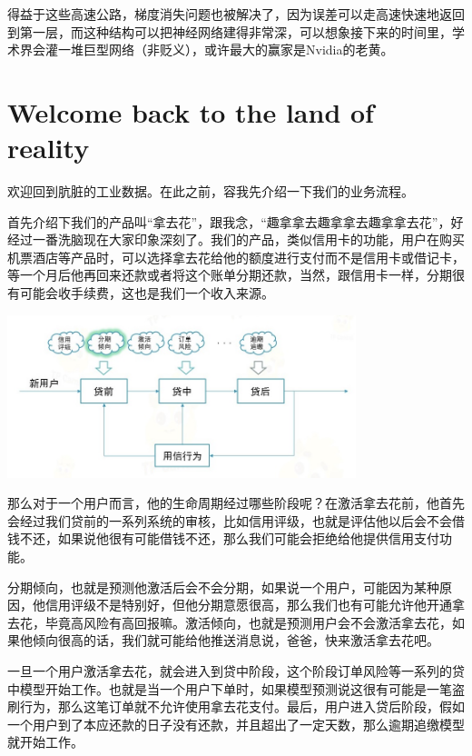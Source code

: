 \documentclass{article}
\begin{document}
得益于这些高速公路，梯度消失问题也被解决了，因为误差可以走高速快速地返回到第一层，而这种结构可以把神经网络建得非常深，可以想象接下来的时间里，学术界会灌一堆巨型网络（非贬义），或许最大的赢家是Nvidia的老黄。








\section{Welcome back to the land of reality}
欢迎回到肮脏的工业数据。在此之前，容我先介绍一下我们的业务流程。

首先介绍下我们的产品叫“拿去花”，跟我念，“趣拿拿去趣拿拿去趣拿拿去花”，好经过一番洗脑现在大家印象深刻了。我们的产品，类似信用卡的功能，用户在购买机票酒店等产品时，可以选择拿去花给他的额度进行支付而不是信用卡或借记卡，等一个月后他再回来还款或者将这个账单分期还款，当然，跟信用卡一样，分期很有可能会收手续费，这也是我们一个收入来源。

\begin{center}
\includegraphics[width=4in]{image/image24.jpg}
\end{center}

那么对于一个用户而言，他的生命周期经过哪些阶段呢？在激活拿去花前，他首先会经过我们贷前的一系列系统的审核，比如信用评级，也就是评估他以后会不会借钱不还，如果说他很有可能借钱不还，那么我们可能会拒绝给他提供信用支付功能。

分期倾向，也就是预测他激活后会不会分期，如果说一个用户，可能因为某种原因，他信用评级不是特别好，但他分期意愿很高，那么我们也有可能允许他开通拿去花，毕竟高风险有高回报嘛。激活倾向，也就是预测用户会不会激活拿去花，如果他倾向很高的话，我们就可能给他推送消息说，爸爸，快来激活拿去花吧。

一旦一个用户激活拿去花，就会进入到贷中阶段，这个阶段订单风险等一系列的贷中模型开始工作。也就是当一个用户下单时，如果模型预测说这很有可能是一笔盗刷行为，那么这笔订单就不允许使用拿去花支付。最后，用户进入贷后阶段，假如一个用户到了本应还款的日子没有还款，并且超出了一定天数，那么逾期追缴模型就开始工作。
\end{document}
